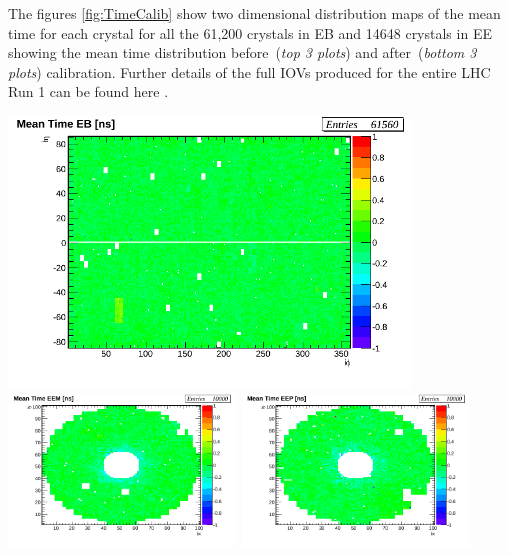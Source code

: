 The figures \ref{fig:TimeCalib} show two dimensional distribution maps of the mean time for each crystal for all the 61,200 crystals in EB and 14648 crystals in EE showing the mean time distribution before~(\textit{top 3 plots}) and after~(\textit{bottom 3 plots}) calibration.
Further details of the full IOVs produced for the entire LHC Run 1 can be found here \cite{ECALCAL}.
\begin{center}
\centering
\mbox{\includegraphics[height=0.40\textwidth, width=0.80\textwidth]{THESISPLOTS/calibDiffMapEB_Before_Calibration.png}}
\mbox{\includegraphics[height=0.42\textwidth, width=0.45\textwidth]{THESISPLOTS/calibDiffMapEEM_Before_CALIB.png} \quad
\includegraphics[height=0.42\textwidth, width=0.45\textwidth]{THESISPLOTS/calibDiffMapEEP_Before_CALIB.png}
}
\vspace{1.5cm}


\end{center}
